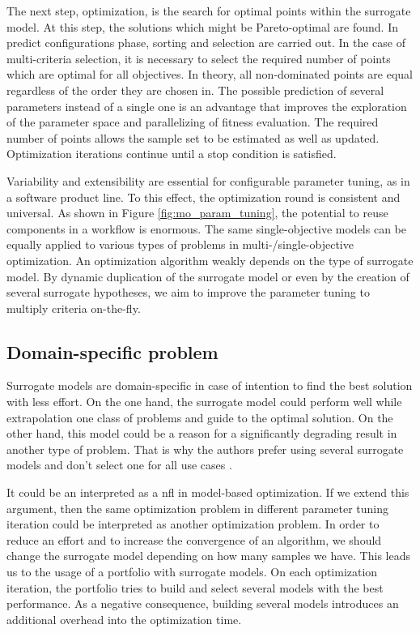             The next step, optimization, is the search for optimal points within the surrogate model. At this step, the solutions which might be Pareto-optimal are found. In predict configurations phase, sorting and selection are carried out. In the case of multi-criteria selection, it is necessary to select the required number of points which are optimal for all objectives. In theory, all non-dominated points are equal regardless of the order they are chosen in. The possible prediction of several parameters instead of a single one is an advantage that improves the exploration of the parameter space and parallelizing of fitness evaluation. The required number of points allows the sample set to be estimated as well as updated. Optimization iterations continue until a stop condition is satisfied.
    
            Variability and extensibility are essential for configurable parameter tuning, as in a software product line. To this effect, the optimization round is consistent and universal. As shown in Figure \ref{fig:mo_param_tuning}, the potential to reuse components in a workflow is enormous. The same single-objective models can be equally applied to various types of problems in multi-/single-objective optimization. An optimization algorithm weakly depends on the type of surrogate model. By dynamic duplication of the surrogate model or even by the creation of several surrogate hypotheses, we aim to improve the parameter tuning to multiply criteria on-the-fly.

        \subsection{Domain-specific problem}
        Surrogate models are domain-specific in case of intention to find the best solution with less effort. On the one hand, the surrogate model could perform well while extrapolation one class of problems and guide to the optimal solution. On the other hand, this model could be a reason for a significantly degrading result in another type of problem. That is why the authors prefer using several surrogate models and don't select one for all use cases \cite{SoftSurvey}. 

        It could be an interpreted as a \Gls{nfl} in model-based optimization. If we extend this argument, then the same optimization problem in different parameter tuning iteration could be interpreted as another optimization problem. In order to reduce an effort and to increase the convergence of an algorithm, we should change the surrogate model depending on how many samples we have. 
        This leads us to the usage of a portfolio with surrogate models. On each optimization iteration, the portfolio tries to build and select several models with the best performance.  As a negative consequence, building several models introduces an additional overhead into the optimization time.


